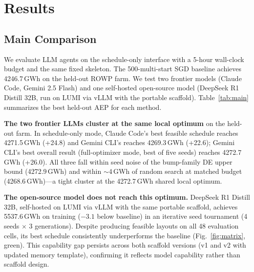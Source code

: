 \section{Results}
\label{sec:results}

\subsection{Main Comparison}
\label{sec:main_comparison}

We evaluate LLM agents on the schedule-only interface with a
5-hour wall-clock budget and the same fixed skeleton. The 500-multi-start
SGD baseline achieves 4246.7\,GWh on the
held-out ROWP farm. We test two frontier models (Claude Code, Gemini
2.5 Flash) and one self-hosted open-source model (DeepSeek R1
Distill 32B, run on LUMI via vLLM with the portable scaffold).
Table~\ref{tab:main} summarizes the best held-out AEP for each method.


\textbf{The two frontier LLMs cluster at the same local optimum} on the
held-out farm. In schedule-only mode, Claude Code's best feasible
schedule reaches 4271.5\,GWh (+24.8) and Gemini CLI's reaches
4269.3\,GWh (+22.6); Gemini CLI's best overall result (full-optimizer
mode, best of five seeds) reaches 4272.7\,GWh (+26.0). All three
fall within seed noise of the bump-family DE upper bound
(4272.9\,GWh) and within $\sim$4\,GWh of random search at matched
budget (4268.6\,GWh)---a tight cluster at the 4272.7\,GWh
shared local optimum.

\textbf{The open-source model does not reach this optimum.}
DeepSeek R1 Distill 32B, self-hosted on LUMI via vLLM with the
same portable scaffold, achieves 5537.6\,GWh on training ($-3.1$
below baseline) in an iterative seed tournament (4 seeds $\times$
3 generations). Despite producing feasible layouts on all 48
evaluation cells, its best schedule consistently underperforms the
baseline (Fig.~\ref{fig:matrix}, green). This capability gap
persists across both scaffold versions (v1 and v2 with updated
memory template), confirming it reflects model capability rather
than scaffold design.

